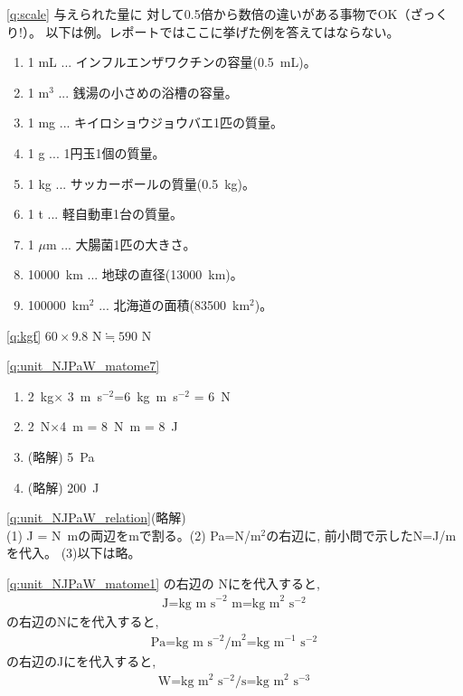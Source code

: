 \ref{q:scale} 与えられた量に
対して0.5倍から数倍の違いがある事物でOK（ざっくり!）。
以下は例。レポートではここに挙げた例を答えてはならない。
\begin{enumerate}
\item 1 mL ... インフルエンザワクチンの容量(0.5~mL)。
\item 1 m$^3$ ... 銭湯の小さめの浴槽の容量。
\item 1 mg ... キイロショウジョウバエ1匹の質量。
\item 1 g ... 1円玉1個の質量。
\item 1 kg ... サッカーボールの質量(0.5~kg)。
\item 1 t ... 軽自動車1台の質量。
\item 1 $\mu$m ... 大腸菌1匹の大きさ。
\item 10000~km ... 地球の直径(13000~km)。
\item 100000~km$^2$ ... 北海道の面積(83500~km$^2$)。
\end{enumerate}


\ref{q:kgf} $60\times 9.8\text{ N}\fallingdotseq590\text{ N}$




\ref{q:unit_NJPaW_matome7}
\begin{enumerate}
\item 2~kg$\times$ 3~m~s$^{-2}$=6~kg~m~s$^{-2}$ = 6~N
\item 2~N$\times$4~m = 8~N~m = 8~J
\item (略解) 5~Pa
\item (略解) 200~J
\end{enumerate}


\ref{q:unit_NJPaW_relation}(略解)\\
(1) J = N~mの両辺をmで割る。(2) Pa=N/m$^2$の右辺に, 前小問で示したN=J/mを代入。
(3)以下は略。\mv

\ref{q:unit_NJPaW_matome1} の右辺の
Nにを代入すると, 
\begin{eqnarray}
\text{J=kg m s}^{-2}\text{ m=kg m}^2\text{ s}^{-2}\label{eq:J_kgms}
\end{eqnarray}
の右辺のNにを代入すると, 
\begin{eqnarray}
\text{Pa=kg m s}^{-2}\text{/m}^2\text{=kg m}^{-1}\text{ s}^{-2}\label{eq:Pa_kgms}
\end{eqnarray}
の右辺のJにを代入すると, 
\begin{eqnarray}
\text{W=kg m}^2\text{ s}^{-2}/\text{s}\text{=kg m}^2\text{ s}^{-3}\label{eq:W_kgms}
\end{eqnarray}

